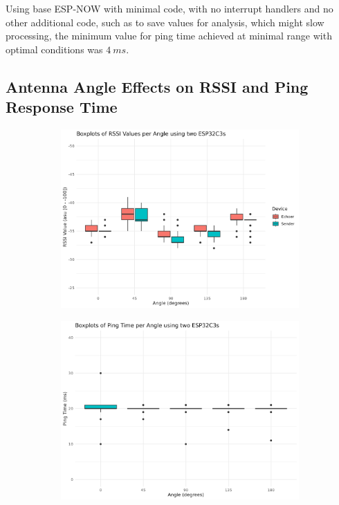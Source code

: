 Using base ESP-NOW with minimal code, with no interrupt handlers and no other additional code, such as to save values for analysis, which might slow processing, the minimum value for ping time achieved at minimal range with optimal conditions was $4\ ms$.

\subsection{\label{sec:res_angle}Antenna Angle Effects on RSSI and Ping Response Time}

\begin{figure}[H]
    \centering
    \begin{subfigure}{0.45\textwidth}
        \includegraphics[width=\linewidth]{rstudio/analysis/plots/angle_rssi_box.png}
    \end{subfigure}
    \begin{subfigure}{0.45\textwidth}
        \includegraphics[width=\linewidth]{rstudio/analysis/plots/angle_ping_box.png}

\end{subfigure}
\end{figure}
